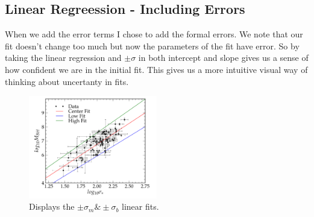 \documentclass[11pt,letterpaper]{article}
\begin{document}
\subsection{Linear Regreession - Including Errors}

When we add the error terms I chose to add the formal errors. We note that our
fit doesn't change too much but now the parameters of the fit have error. So
by taking the linear regression and $\pm \sigma$ in both intercept and slope 
gives us a sense of how confident we are in the initial fit. This gives us a 
more intuitive visual way of thinking about uncertanty in fits.

\begin{figure}[bth]
\centering
\includegraphics[width=0.5\textwidth]{1c.pdf}
\caption{Displays the $\pm \sigma_m \& \pm \sigma_b $ linear fits.}
\label{fig:dft}
\end{figure}
\end{document}
